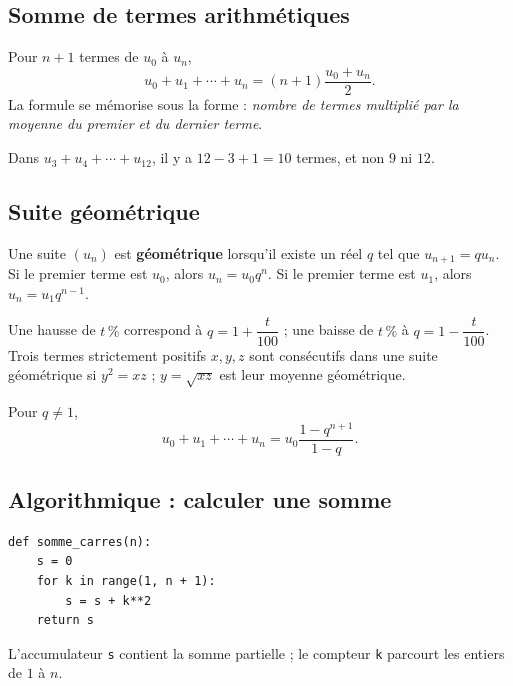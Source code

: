 \subsection{Somme de termes arithmétiques}
Pour $n+1$ termes de $u_0$ à $u_n$,
\[
u_0+u_1+\cdots+u_n=(n+1)\frac{u_0+u_n}{2}.
\]
La formule se mémorise sous la forme : \emph{nombre de termes multiplié par la moyenne du premier et du dernier terme}.

\begin{pitfall}
Dans $u_3+u_4+\cdots+u_{12}$, il y a $12-3+1=10$ termes, et non $9$ ni $12$.
\end{pitfall}

\subsection{Suite géométrique}
\begin{keypoint}
Une suite $(u_n)$ est \textbf{géométrique} lorsqu'il existe un réel $q$ tel que $u_{n+1}=q u_n$. Si le premier terme est $u_0$, alors $u_n=u_0q^n$. Si le premier terme est $u_1$, alors $u_n=u_1q^{n-1}$.
\end{keypoint}

\begin{center}
\end{center}

Une hausse de $t\,\%$ correspond à $q=1+\dfrac{t}{100}$ ; une baisse de $t\,\%$ à $q=1-\dfrac{t}{100}$. Trois termes strictement positifs $x,y,z$ sont consécutifs dans une suite géométrique si $y^2=xz$ ; $y=\sqrt{xz}$ est leur moyenne géométrique.

Pour $q\neq1$,
\[
u_0+u_1+\cdots+u_n=u_0\frac{1-q^{n+1}}{1-q}.
\]

\subsection{Algorithmique : calculer une somme}
\begin{lstlisting}[style=python]
def somme_carres(n):
    s = 0
    for k in range(1, n + 1):
        s = s + k**2
    return s
\end{lstlisting}
L'accumulateur \texttt{s} contient la somme partielle ; le compteur \texttt{k} parcourt les entiers de $1$ à $n$.

